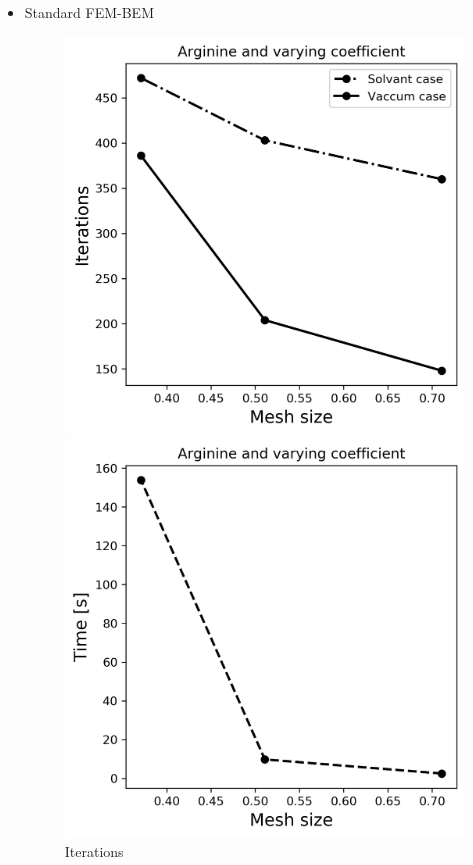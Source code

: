     \begin{itemize}
        \item Standard FEM-BEM
\begin{figure}[!htb]
  \includegraphics[width=\linewidth]{FEM_BEM_Sphere_varying_coeff_iter.png}
  \caption{Iterations}
\endminipage\hfill
{}%
  \includegraphics[width=\linewidth]{FEM_BEM_Sphere_varying_coeff_time.png}

\end{figure}
\end{itemize}
